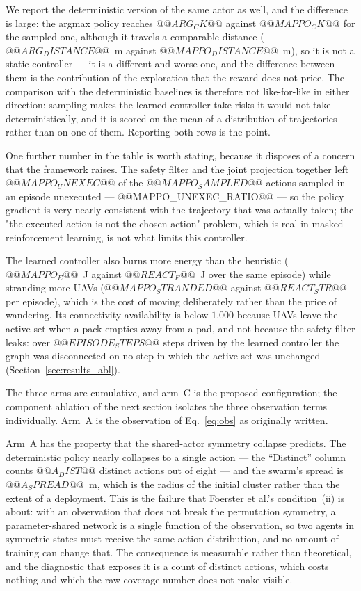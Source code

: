 We report the
deterministic version of the same actor as
well, and the difference is large: the argmax policy reaches $@@ARG_CK@@$
against $@@MAPPO_CK@@$ for the sampled one, although it travels a comparable
distance ($@@ARG_DISTANCE@@$~m against $@@MAPPO_DISTANCE@@$~m), so it is
not a static controller --- it is a different and worse one, and the
difference between them is the contribution of the exploration that the
reward does not price.  The comparison with the deterministic baselines is
therefore not like-for-like in either direction: sampling makes the learned
controller take risks it would not take deterministically, and it is scored
on the mean of a distribution of trajectories rather than on one of them.
Reporting both rows is the point.

One further number in the table is worth stating, because it disposes of a
concern that the framework raises.  The safety filter and the joint
projection together left $@@MAPPO_UNEXEC@@$ of the $@@MAPPO_SAMPLED@@$
actions sampled in an episode unexecuted --- @@MAPPO_UNEXEC_RATIO@@ --- so the
policy gradient is very nearly
consistent with the trajectory that was actually taken; the
"the executed action is not the chosen action" problem, which is real in
masked reinforcement learning, is not what limits this controller.

The learned controller also burns more energy than the heuristic
($@@MAPPO_E@@$~J against $@@REACT_E@@$~J over the same episode) while
stranding more UAVs ($@@MAPPO_STRANDED@@$ against $@@REACT_STR@@$ per
episode), which is the cost of moving deliberately rather than the price of
wandering.  Its connectivity availability is
below $1.000$ because UAVs leave the active set when a pack empties away
from a pad, and not because the safety filter leaks: over $@@EPISODE_STEPS@@$
steps driven by the learned controller the graph was disconnected on no step in
which the active set was unchanged (Section~\ref{sec:results_abl}).


The three arms are cumulative, and arm~C is the proposed configuration; the
component ablation of the next section isolates the three observation terms
individually.  Arm~A is the observation of Eq.~\eqref{eq:obs} as originally
written.

Arm~A has the property that the shared-actor symmetry collapse predicts.
The deterministic policy nearly collapses to a single action --- the
``Distinct'' column counts $@@A_DIST@@$ distinct actions out of eight --- and
the swarm's spread is $@@A_SPREAD@@$~m, which is the radius of the initial
cluster rather than the extent of a deployment.  This is the failure that
Foerster et al.'s condition~(ii) is about: with an observation that does not
break the permutation symmetry, a parameter-shared network is a single
function of the observation, so two agents in symmetric states must receive
the same action distribution, and no amount of training can change that.
The consequence is measurable rather than theoretical, and the diagnostic
that exposes it is a count of distinct actions, which costs nothing and
which the raw coverage number does not make visible.

